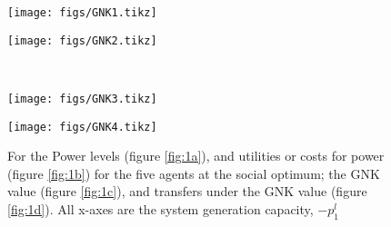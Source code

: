 

\begin{figure}[]
	
	\begin{minipage}[t]{.48\linewidth}
		\texttt{[image: figs/GNK1.tikz]}%
\label{fig:1a}
	\end{minipage}
	\begin{minipage}[t]{.48\linewidth}
		\texttt{[image: figs/GNK2.tikz]}%
\label{fig:1b}
	\end{minipage}
\vspace{5mm}\\
	\begin{minipage}[t]{.48\linewidth}
		\texttt{[image: figs/GNK3.tikz]}%
\label{fig:1c}
	\end{minipage}
	\begin{minipage}[t]{.48\linewidth}
		\texttt{[image: figs/GNK4.tikz]}%
\label{fig:1d}
	\end{minipage}
	\vspace{0.3\baselineskip}
	\caption{For the Power levels (figure \ref{fig:1a}), and utilities or costs for power (figure \ref{fig:1b}) for the five agents at the social optimum; the GNK value (figure \ref{fig:1c}), and transfers under the GNK value (figure \ref{fig:1d}). All x-axes are the system generation capacity, $-p_1^l$}\label{fig:1}
\end{figure}





